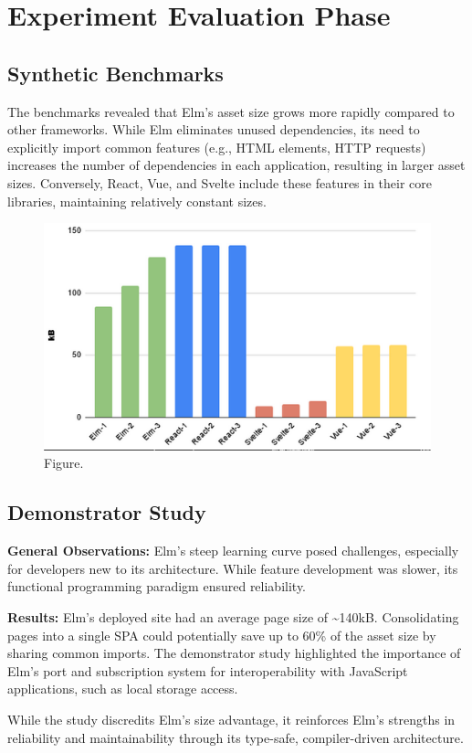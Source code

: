 \section{Experiment Evaluation Phase}


\subsection{Synthetic Benchmarks}
The benchmarks revealed that Elm's asset size grows more rapidly compared to other frameworks. While Elm eliminates unused dependencies, its need to explicitly import common features (e.g., HTML elements, HTTP requests) increases the number of dependencies in each application, resulting in larger asset sizes. Conversely, React, Vue, and Svelte include these features in their core libraries, maintaining relatively constant sizes.

\begin{figure}[thb]
	\centering
	\includegraphics[scale=0.5]{figs/diagram3.png}
	\caption{Figure.}
	\label{fig:diagram3}
\end{figure}

\subsection{Demonstrator Study}
\textbf{General Observations:} Elm's steep learning curve posed challenges, especially for developers new to its architecture. While feature development was slower, its functional programming paradigm ensured reliability.

\textbf{Results:} Elm’s deployed site had an average page size of \textasciitilde 140kB. Consolidating pages into a single SPA could potentially save up to 60\% of the asset size by sharing common imports. The demonstrator study highlighted the importance of Elm's port and subscription system for interoperability with JavaScript applications, such as local storage access.

While the study discredits Elm's size advantage, it reinforces Elm’s strengths in reliability and maintainability through its type-safe, compiler-driven architecture.